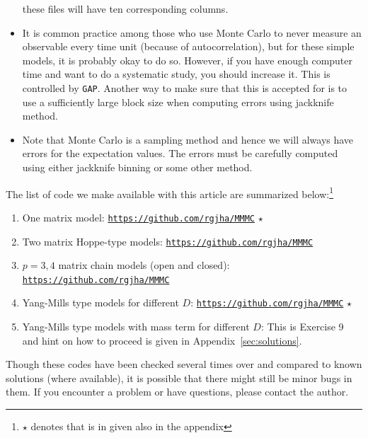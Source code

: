 \documentclass[11pt]{article}
\begin{document}
\begin{itemize}
these files will have ten corresponding columns. 
\item It is common practice among those who use Monte Carlo to never measure an observable every time unit (because of autocorrelation), but for these simple models, it is probably okay to do so. However, if you
have enough computer time and want to do a systematic study, you should increase it. This is controlled by \texttt{GAP}. Another way to make sure that this is accepted for is to use a sufficiently large block size when computing errors using jackknife method. 
\item Note that Monte Carlo is a sampling method and hence we will always have errors for the expectation values. The errors must be carefully computed using either jackknife binning or some other method. 
\end{itemize} 

The list of code we make available with this article are summarized below:\footnote{$\star$ denotes that is in given also in the appendix}
\begin{enumerate}
\item One matrix model: \texttt{\href{https://github.com/rgjha/MMMC}{https://github.com/rgjha/MMMC}}  ${\star}$
\item Two matrix Hoppe-type models: \texttt{\href{https://github.com/rgjha/MMMC}{https://github.com/rgjha/MMMC}}  
\item $p=3,4$ matrix chain models (open and closed): \texttt{\href{https://github.com/rgjha/MMMC}{https://github.com/rgjha/MMMC}}
\item Yang-Mills type models for different $D$: \texttt{\href{https://github.com/rgjha/MMMC}{https://github.com/rgjha/MMMC}} ${\star}$
\item Yang-Mills type models with mass term for different $D$: This is Exercise 9 and hint on how to proceed 
is given in Appendix~\ref{sec:solutions}.
\end{enumerate}
Though these codes have been checked several times over 
and compared to known solutions (where available), it is possible 
that there might still be minor bugs in them. If you encounter a problem or 
have questions, please contact the author. 
\end{document}
